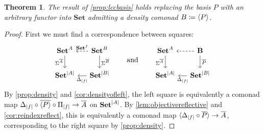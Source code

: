 \documentclass[11pt, oneside, article]{memoir}
\theoremstyle{plain}
\newtheorem{theorem}{Theorem}[section]
\theoremstyle{definition}
\theoremstyle{remark}
\DeclarePairedDelimiter{\gen}{\langle}{\rangle}
\DeclarePairedDelimiter{\abs}{\lvert}{\rvert}
\newcommand{\tn}[1]{\textnormal{#1}}
\newcommand{\namedcat}[1]{\mathbf{#1}}
\newcommand{\cat}[1]{\mathbf{#1}}
\newcommand{\Set}{\namedcat{Set}}
\newcommand{\CoalgOn}[2]{{#2}^{#1}}
\newcommand{\CoalgSet}[1]{\CoalgOn{#1}{\Set}}
\newcommand{\clift}[1]{\overline{#1}}
\newcommand{\pts}[1]{{\abs{#1}}}
\newcommand{\one}[1]{\pts{#1}}
\newcommand{\ptlift}[1]{\overline{#1}}
\newcommand{\carr}{\Sigma}
\newcommand{\reindex}[1]{\Delta_{#1}}
\newcommand{\car}[1]{\carr^{#1}}
\newcommand{\ph}[1]{#1}
\newcommand{\con}[2]{{#1}^{#2}}
\newcommand{\cmnd}[1]{{#1}}
\newcommand{\cA}{\cmnd{A}}
\newcommand{\cB}{\cmnd{B}}
\newcommand{\bB}{\cat{B}}
\newcommand{\pP}{\ph{P}}
\newcommand{\cP}{\gen{\pP}}
\newcommand{\ASet}{\CoalgSet{\cA}}
\newcommand{\BSet}{\CoalgSet{\cB}}
\newcommand{\SetpA}{\Set^\pts{\cA}}
\newcommand{\SetpB}{\Set^\pts{\cB}}
\newcommand{\hh}[2][]{#1 \tn{#2} #1}
\newcommand{\qqand}{\hh[\qquad]{and}}
\begin{document}
\begin{theorem}\label{prop:subbasiscont}
  The result of \cref{prop:lccbasis} holds replacing the basis $\pP$
  with an arbitrary functor into $\Set$ admitting a density comonad
  $\cB \coloneqq \cP$.
\end{theorem}
\begin{proof}
  First we must find a correspondence between squares:
  \[
    \begin{tikzcd}[column sep=12.5]
      \ASet & \BSet \\
      {\SetpA} & {\SetpB}
      \arrow["\car{\clift{\cA}}"', from=1-1, to=2-1]
      \arrow["{\con{\Set}{f}}"', dashed, from=1-2, to=1-1]
      \arrow["\car{\clift{\cB}}", from=1-2, to=2-2]
      \arrow["{\reindex{\one{f}}}", from=2-2, to=2-1]
    \end{tikzcd}
    \qqand
    \begin{tikzcd}[column sep=12.5]
      \ASet & \bB \\
      {\SetpA} & {\SetpB}
      \arrow["\car{\clift{\cA}}"', from=1-1, to=2-1]
      \arrow[dashed, from=1-2, to=1-1]
      \arrow["{\ptlift{\pP}}", from=1-2, to=2-2]
      \arrow["{\reindex{\one{f}}}", from=2-2, to=2-1]
    \end{tikzcd}
  \]
  By \cref{prop:density} and \cref{cor:densityofleft}, the left square
  is equivalently a comonad map
  $\reindex{\one{f}} \circ \clift{\cP} \circ \Pi_{\one{f}} \to
  \clift{\cA}$ on $\SetpA$. By \cref{lem:objectivereflective} and
  \cref{cor:reindexreflect}, this is equivalently a comonad map
  $\gen{\reindex{\one{f}} \circ \ptlift{\pP}} \to \clift{\cA}$,
  corresponding to the right square by \cref{prop:density}.
  

\end{proof}
\end{document}
